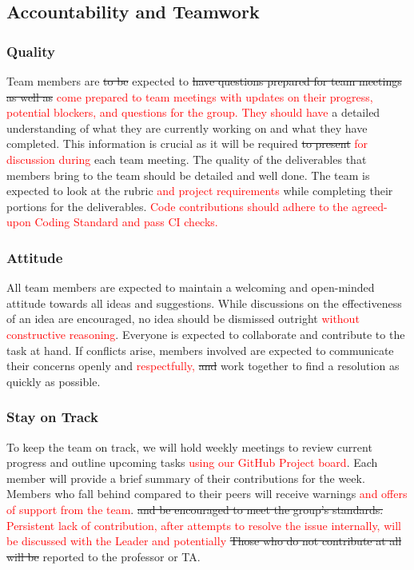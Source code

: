 \documentclass{article}
\begin{document}
\subsection*{Accountability and Teamwork}

\subsubsection*{Quality}
Team members are \sout{to be} expected to \sout{have questions prepared for team meetings as well as} \textcolor{red}{come prepared to team meetings with updates on their progress, potential blockers, and questions for the group. They should have} a detailed understanding of what they are currently working on and what they have completed. This information is crucial as it will be required \sout{to present} \textcolor{red}{for discussion during} each team meeting. The quality of the deliverables that members bring to the team should be detailed and well done. The team is expected to look at the rubric \textcolor{red}{and project requirements} while completing their portions for the deliverables. \textcolor{red}{Code contributions should adhere to the agreed-upon Coding Standard and pass CI checks.}

\subsubsection*{Attitude}
All team members are expected to maintain a welcoming and open-minded attitude towards all ideas and suggestions. While discussions on the effectiveness of an idea are encouraged, no idea should be dismissed outright \textcolor{red}{without constructive reasoning}. Everyone is expected to collaborate and contribute to the task at hand. If conflicts arise, members involved are expected to communicate their concerns openly and \textcolor{red}{respectfully,} \sout{and} work together to find a resolution as quickly as possible.

\subsubsection*{Stay on Track}
To keep the team on track, we will hold weekly meetings to review current progress and outline upcoming tasks \textcolor{red}{using our GitHub Project board}. Each member will provide a brief summary of their contributions for the week. Members who fall behind compared to their peers will receive warnings \textcolor{red}{and offers of support from the team}. \sout{and be encouraged to meet the group’s standards.} \textcolor{red}{Persistent lack of contribution, after attempts to resolve the issue internally, will be discussed with the Leader and potentially} \sout{Those who do not contribute at all will be} reported to the professor or TA.
\end{document}
